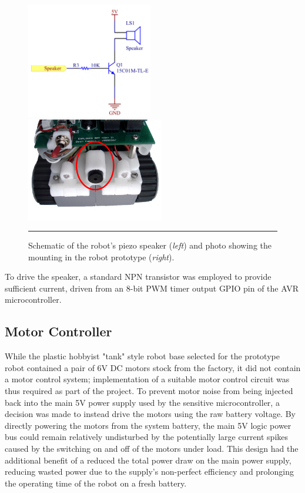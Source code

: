 \begin{figure}[tbph]
	\centering
		\includegraphics[width=55mm]{./Figures/SpeakerSchematic.png}
		\includegraphics[width=60mm]{./Figures/RobotFront.png}
	\rule{35em}{0.5pt}
	\caption[Speaker Schematic and Mounting Photo]{Schematic of the robot's piezo speaker (\textit{left}) and photo showing the mounting in the robot prototype (\textit{right}).}
	\label{fig:robotspeaker}
\end{figure}

To drive the speaker, a standard NPN transistor was employed to provide sufficient current, driven from an 8-bit PWM timer output GPIO pin of the AVR microcontroller.

\FloatBarrier
\subsection{Motor Controller}

While the plastic hobbyist "tank" style robot base selected for the prototype robot contained a pair of 6V DC motors stock from the factory, it did not contain a motor control system; implementation of a suitable motor control circuit was thus required as part of the project. To prevent motor noise from being injected back into the main 5V power supply used by the sensitive microcontroller, a decision was made to instead drive the motors using the raw battery voltage. By directly powering the motors from the system battery, the main 5V logic power bus could remain relatively undisturbed by the potentially large current spikes caused by the switching on and off of the motors under load. This design had the additional benefit of a reduced the total power draw on the main power supply, reducing wasted power due to the supply's non-perfect efficiency and prolonging the operating time of the robot on a fresh battery.

